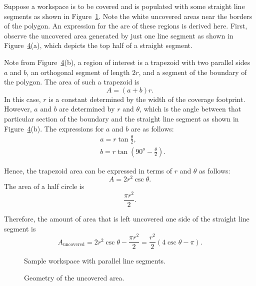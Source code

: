 \documentclass[../main.tex]{subfiles}
\begin{document}
\begin{remark}
Suppose a workspace is to be covered and is populated with some straight line segments as shown in Figure~\ref{fig:sample_area}. Note the white uncovered areas near the borders of the polygon. An expression for the are of these regions is derived here. First, observe the uncovered area generated by just one line segment as shown in Figure~\ref{fig:area_error}(a), which depicts the top half of a straight segment.

Note from Figure~\ref{fig:area_error}(b), a region of interest is a trapezoid with two parallel sides $a$ and $b$, an orthogonal segment of length $2r$, and a segment of the boundary of the polygon. The area of such a trapezoid is
\begin{equation}
	A=(a+b)r.
\end{equation}
In this case, $r$ is a constant determined by the width of the coverage footprint. However, $a$ and $b$ are determined by $r$ and $\theta$, which is the angle between that particular section of the boundary and the straight line segment as shown in Figure~\ref{fig:area_error}(b). The expressions for $a$ and $b$ are as follows:
\begin{equation}
	\begin{aligned}
		&a=r\tan{\frac{\theta}{2}},\\
		&b=r\tan\left(90^o-\frac{\theta}{2}\right).
	\end{aligned}
\end{equation}

Hence, the trapezoid area can be expressed in terms of $r$ and $\theta$ as follows:
\begin{equation}
	A=2r^2\csc{\theta}.
\end{equation}
The area of a half circle is
\begin{equation}
	\frac{\pi r^2}{2}.
\end{equation}

Therefore, the amount of area that is left uncovered one side of the straight line segment is
\begin{equation}
	A_{\text{uncovered}}=2r^2\csc\theta-\frac{\pi r^2}{2}=\frac{r^2}{2}(4\csc\theta-\pi).
\end{equation}
\RE
\end{remark}

\begin{figure}
	\centering
	
	\caption{Sample workspace with parallel line segments.}
	\label{fig:sample_area}
\end{figure}
\begin{figure}
	\centering
	\begin{subfigure}{0.5\linewidth}
		\centering
		
		\caption{\label{fig:area_error_i}}
	\end{subfigure}%
	\begin{subfigure}{0.5\linewidth}
		\centering
		
		\caption{\label{fig:area_error_ii}}
	\end{subfigure}
	\caption{Geometry of the uncovered area.}
	\label{fig:area_error}
\end{figure}
\end{document}
